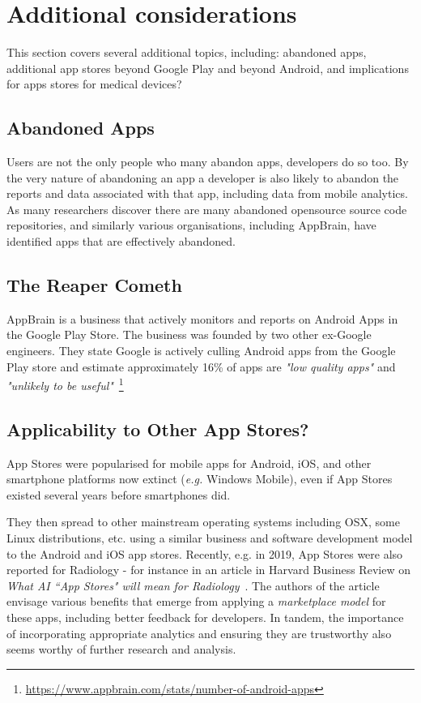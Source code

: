 \section{Additional considerations}
This section covers several additional topics, including: abandoned apps, additional app stores beyond Google Play and beyond Android, and implications for apps stores for medical devices?

\subsection{Abandoned Apps}
Users are not the only people who many abandon apps, developers do so too. By the very nature of abandoning an app a developer is also likely to abandon the reports and data associated with that app, including data from mobile analytics. As many researchers discover there are many abandoned opensource source code repositories, and similarly various organisations, including AppBrain, have identified apps that are effectively abandoned. %

\subsection{The Reaper Cometh}
AppBrain is a business that actively monitors and reports on Android Apps in the Google Play Store. The business was founded by two other ex-Google engineers. They state Google is actively culling Android apps from the Google Play store and estimate approximately 16\% of apps are \emph{"low quality apps"} and \emph{"unlikely to be useful"}~\footnote{\url{https://www.appbrain.com/stats/number-of-android-apps}} %


\subsection{Applicability to Other App Stores?}
App Stores were popularised for mobile apps for Android, iOS, and other smartphone platforms now extinct (\emph{e.g.} Windows Mobile), even if App Stores existed several years before smartphones did. %


They then spread to other mainstream operating systems including OSX, some Linux distributions, etc. using a similar business and software development model to the Android and iOS app stores. Recently, e.g. in 2019, App Stores were also reported for Radiology - for instance in an article in Harvard Business Review on \emph{What AI ``App Stores" will mean for Radiology}~\cite{hbr_what_ai_app_stores_mean_for_radiology}. The authors of the article envisage various benefits that emerge from applying a \emph{marketplace model} for these apps, including better feedback for developers. In tandem, the importance of incorporating appropriate analytics and ensuring they are trustworthy also seems worthy of further research and analysis. 

